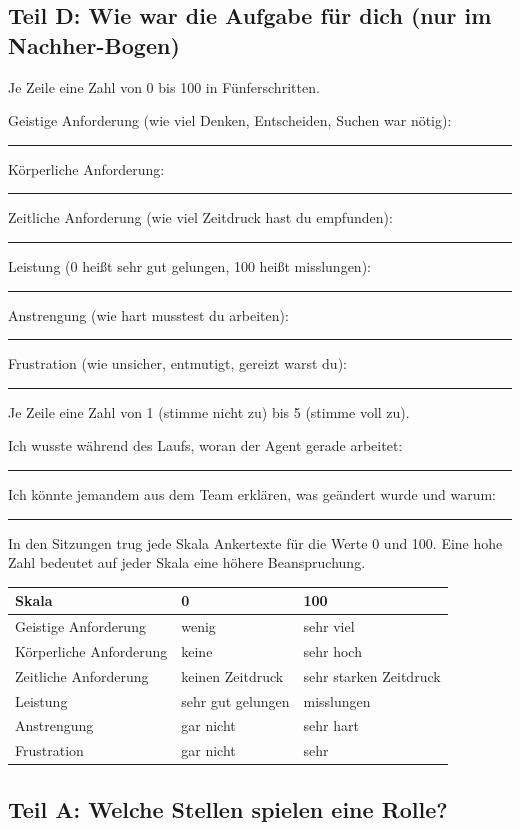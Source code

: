 \medskip

\subsection*{Teil D: Wie war die Aufgabe für dich (nur im Nachher-Bogen)}

Je Zeile eine Zahl von 0 bis 100 in Fünferschritten.

\noindent Geistige Anforderung (wie viel Denken, Entscheiden, Suchen war nötig):~\rule{2.5em}{0.4pt}\par
\noindent Körperliche Anforderung:~\rule{2.5em}{0.4pt}\par
\noindent Zeitliche Anforderung (wie viel Zeitdruck hast du empfunden):~\rule{2.5em}{0.4pt}\par
\noindent Leistung (0 heißt sehr gut gelungen, 100 heißt misslungen):~\rule{2.5em}{0.4pt}\par
\noindent Anstrengung (wie hart musstest du arbeiten):~\rule{2.5em}{0.4pt}\par
\noindent Frustration (wie unsicher, entmutigt, gereizt warst du):~\rule{2.5em}{0.4pt}\par
Je Zeile eine Zahl von 1 (stimme nicht zu) bis 5 (stimme voll zu).

\noindent Ich wusste während des Laufs, woran der Agent gerade arbeitet:~\rule{2.5em}{0.4pt}\par
\noindent Ich könnte jemandem aus dem Team erklären, was geändert wurde und warum:~\rule{2.5em}{0.4pt}\par
\noindent In den Sitzungen trug jede Skala Ankertexte für die Werte 0 und 100. Eine hohe Zahl bedeutet auf jeder Skala eine höhere Beanspruchung.

\begin{center}
\small
\begin{tabular}{lll}
\toprule
Skala & 0 & 100 \\
\midrule
Geistige Anforderung & wenig & sehr viel \\
Körperliche Anforderung & keine & sehr hoch \\
Zeitliche Anforderung & keinen Zeitdruck & sehr starken Zeitdruck \\
Leistung & sehr gut gelungen & misslungen \\
Anstrengung & gar nicht & sehr hart \\
Frustration & gar nicht & sehr \\
\bottomrule
\end{tabular}
\end{center}
\subsection*{Teil A: Welche Stellen spielen eine Rolle?}

